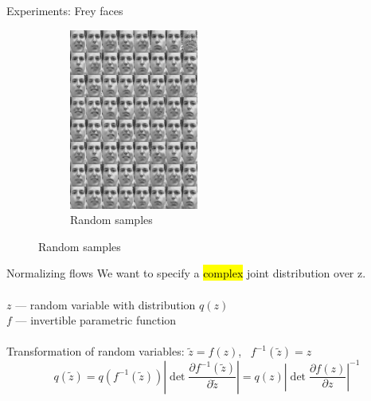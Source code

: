 \documentclass[unicode,11pt]{beamer}
\begin{document}
\begin{frame}{Experiments: Frey faces}
\begin{figure}
\begin{subfigure}[b]{.4\linewidth}
      \includegraphics[width=.8\linewidth]{images/vae_frey_B100_E4000_N560_L2_H200_C_sample_64}
      \caption{Random samples}
    \end{subfigure}
  \end{figure}
\end{frame}


\begin{frame}
  \centering\fontsize{24pt}{1em}\color{darkred}{\selectfont{What is wrong with VAE?}}
\end{frame}


\begin{frame}[fragile]{Normalizing flows}
  We want to specify a \hl{complex} joint distribution over z.\\
  ~\\
  $z$ --- random variable with distribution $q(z)$\\
  $f$ --- invertible parametric function\\
  ~\\
  Transformation of random variables: $\tilde{z} = f(z)$, ~$f^{-1}(\tilde{z}) = z$\\
  $$
  q(\tilde{z})
  = q(f^{-1}(\tilde{z})) \left\vert \det \frac{\partial f^{-1}(\tilde{z})}{\partial \tilde{z}} \right\vert
  = q(z) \left\vert \det \frac{\partial f(z)}{\partial z} \right\vert^{-1}
  $$ \\

\end{frame}
\end{document}
